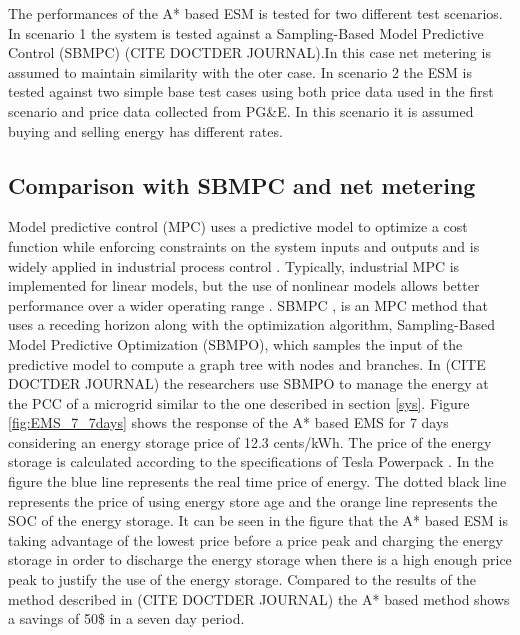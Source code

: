 The performances of the A* based ESM is tested for two different test scenarios. In scenario 1 the system is tested against a Sampling-Based Model Predictive Control (SBMPC) (CITE DOCTDER JOURNAL).In this case net metering is assumed to maintain similarity with the oter case. In scenario 2 the ESM is tested against two simple base test cases using both price data used in the first scenario and price data collected from PG\&E. In this scenario it is assumed buying and selling energy has different rates.

\subsection{Comparison with SBMPC and net metering}
 Model predictive control (MPC) uses a predictive model to optimize a cost function while enforcing constraints on the system inputs and outputs and is widely applied in industrial process control \cite{qin1997overview}. Typically, industrial MPC is implemented for linear models, but the use of nonlinear models allows better performance over a wider operating range \cite{berber2012nonlinear}. SBMPC \cite{dunlap2011book}, \cite{reese2016graph} is an MPC method that uses a receding horizon along with the optimization algorithm, Sampling-Based Model Predictive Optimization (SBMPO), which samples the input of the predictive model to compute a  graph tree with nodes and branches. In (CITE DOCTDER JOURNAL) the researchers use SBMPO to manage the energy at the PCC of a microgrid similar to the one described in section \ref{sys}.
 Figure \ref{fig:EMS_7_7days} shows the response of the A* based EMS for 7 days considering an energy storage price of 12.3 cents/kWh. The price of the energy storage is calculated according to the specifications of Tesla Powerpack \cite{tesla_powerpack_2018}. In the figure the blue line represents the real time price of energy. The dotted black line represents the price of using energy store age and the orange line represents the SOC of the energy storage. It can be seen in the figure that the A* based ESM is taking advantage of the lowest price before a price peak and charging the energy storage in order to discharge the energy storage when there is a high enough price peak to justify the use of the energy storage. Compared to the results of the method described in (CITE DOCTDER JOURNAL) the A* based method shows a savings of 50\$ in a seven day period.
 
